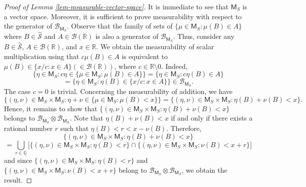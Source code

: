 \documentclass{article}
\theoremstyle{plain}
\theoremstyle{remark}
\begin{document}
\begin{proof}[Proof of Lemma \ref{lem-measurable-vector-space}]
	It is immediate to see that $\mathsf{M}_{S}$ is a vector space. Moreover, it is sufficient to prove measurability with respect to the generator of $\mathcal{B}_{\mathsf{M}_S}$. Observe that the family of sets of $\{\mu\in\mathsf{M}_S:\mu(B)\in A\}$ where $B\in\hat{\mathcal{S}}$ and $A\in\mathcal{B}(\mathbb{R})$ is also a generator of $\mathcal{B}_{\mathsf{M}_S}$. Thus, consider any $B\in\hat{\mathcal{S}}$, $A\in\mathcal{B}(\mathbb{R})$, and $x\in\mathbb{R}$. We obtain the measurability of scalar multiplication using that $c\mu(B)\in A$ is equivalent to $\mu(B)\in \{x/c: x\in A\}(\in\mathcal{B}(\mathbb{R}))$, where $c\in\mathbb{R}\setminus0$. Indeed, 
	\begin{equation*}
		\{\eta\in\mathsf{M}_S:c\eta\in \{\mu\in\mathsf{M}_S:\mu(B)\in A\} \}=	\{\eta\in\mathsf{M}_S:c\eta(B)\in A\}
	\end{equation*}
	\begin{equation*}
		=	\{\eta\in\mathsf{M}_S:\eta(B)\in \{x/c: x\in A\} \}\in \mathcal{B}_{\mathsf{M}_S}.
	\end{equation*}
	The case $c=0$ is trivial. Concerning the measurability of addition, we have
	\begin{equation*}
		\{(\eta,\nu)\in\mathsf{M}_S\times\mathsf{M}_S:\eta+\nu\in \{\mu\in\mathsf{M}_S:\mu(B)<x\} \}		=\{(\eta,\nu)\in\mathsf{M}_S\times\mathsf{M}_S:\eta(B)+\nu(B)<x \}.
	\end{equation*}
	Hence, it remains to show that $\{(\eta,\nu)\in\mathsf{M}_S\times\mathsf{M}_S:\eta(B)+\nu(B)<x\}$ belongs to $\mathcal{B}_{\mathsf{M}_S}\otimes\mathcal{B}_{\mathsf{M}_S}$. Note that $\eta(B)+\nu(B)<x$ if and only if there exists a rational number $r$ such that $\eta(B)<r<x-\nu(B)$. Therefore,
	\begin{equation*}
		\{(\eta,\nu)\in\mathsf{M}_S\times\mathsf{M}_S:\eta(B)+\nu(B)<x\}
	\end{equation*}
	\begin{equation*}
		=\bigcup_{r\in\mathbb{Q}}\Big[ \{(\eta,\nu)\in\mathsf{M}_S\times\mathsf{M}_S:\eta(B)<r\}\cap \{(\eta,\nu)\in\mathsf{M}_S\times\mathsf{M}_S:\nu(B)<x+r\} \Big]
	\end{equation*}
	and since $ \{(\eta,\nu)\in\mathsf{M}_S\times\mathsf{M}_S:\eta(B)<r\}$ and $\{(\eta,\nu)\in\mathsf{M}_S\times\mathsf{M}_S:\nu(B)<x+r\}$ belong to $\mathcal{B}_{\mathsf{M}_S}\otimes\mathcal{B}_{\mathsf{M}_S}$, we obtain the result.
\end{proof}
\end{document}
